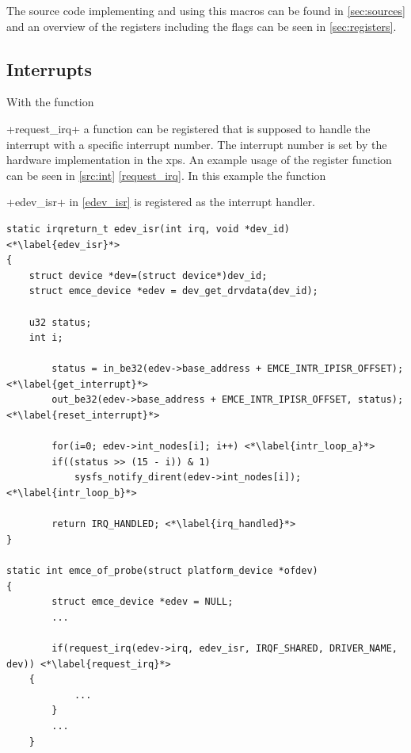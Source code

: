 \documentclass[12pt,a4paper,parskip=full,abstract=true,BCOR=12mm,twoside,open=right]{scrreprt}
\newcommand{\hack}{}
\newcommand*{\SavedLstInline}{}
\DeclareRobustCommand*{\lstinline}{%
  \ifmmode
    \let\SavedBGroup\bgroup
    \def\bgroup{%
      \let\bgroup\SavedBGroup
      \hbox\bgroup
    }%
  \fi
  \SavedLstInline
}
\begin{document}
The source code implementing and using this macros can be found in
\cref{sec:sources} and an overview of the registers including the flags can be
seen in \cref{sec:registers}.


\subsection{Interrupts}
\label{sec:interrupts}

With the function \lstinline+request_irq+ a function can be registered that
is supposed to handle the interrupt with a specific interrupt number\cite{ldd}. The
interrupt number is set by the hardware implementation in the \gls{xps}.
An example usage of the register function can be seen in \cref{src:int}
\cref{request_irq}. In this example the function \lstinline+edev_isr+
in \cref{edev_isr} is registered as the interrupt handler.

\begin{lstlisting}[float=htb,caption={Driver interrupt routine},label=src:int,basicstyle=\hack\scriptsize]
static irqreturn_t edev_isr(int irq, void *dev_id) <*\label{edev_isr}*>
{
	struct device *dev=(struct device*)dev_id;
	struct emce_device *edev = dev_get_drvdata(dev_id);

	u32 status;
	int i;

        status = in_be32(edev->base_address + EMCE_INTR_IPISR_OFFSET); <*\label{get_interrupt}*>
        out_be32(edev->base_address + EMCE_INTR_IPISR_OFFSET, status); <*\label{reset_interrupt}*>

        for(i=0; edev->int_nodes[i]; i++) <*\label{intr_loop_a}*>
		if((status >> (15 - i)) & 1)
			sysfs_notify_dirent(edev->int_nodes[i]); <*\label{intr_loop_b}*>

        return IRQ_HANDLED; <*\label{irq_handled}*>
}

static int emce_of_probe(struct platform_device *ofdev)
{
        struct emce_device *edev = NULL;
        ...

        if(request_irq(edev->irq, edev_isr, IRQF_SHARED, DRIVER_NAME, dev)) <*\label{request_irq}*>
	{
            ...
        }
        ...
    }
\end{lstlisting}
\end{document}
